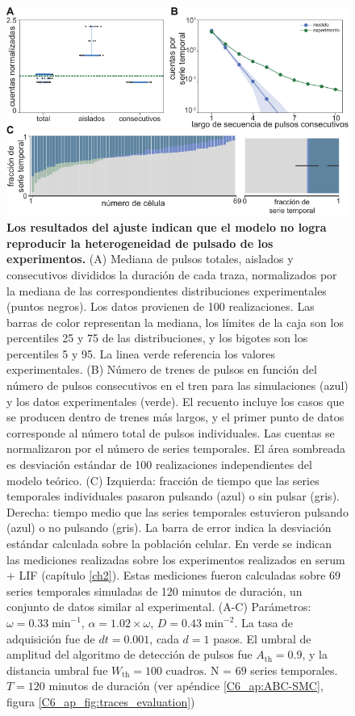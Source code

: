 \documentclass[./main.tex]{subfiles}
\begin{document}
\begin{figure}
    \centering
    \includegraphics[width=1\columnwidth]{figures/chapter6/C6_param_evaluation.pdf} 
    \caption{\textbf{Los resultados del ajuste indican que el modelo no logra reproducir la heterogeneidad de pulsado de los experimentos.} (A) Mediana de pulsos totales, aislados y consecutivos divididos la duración de cada traza, normalizados por la mediana de las correspondientes distribuciones experimentales (puntos negros). Los datos provienen de 100 realizaciones. Las barras de color representan la mediana, los límites de la caja son los percentiles 25 y 75 de las distribuciones, y los bigotes son los percentiles 5 y 95. La linea verde referencia los valores experimentales. (B) Número de trenes de pulsos en función del número de pulsos consecutivos en el tren para las simulaciones (azul) y los datos experimentales (verde). El recuento incluye los casos que se producen dentro de trenes más largos, y el primer punto de datos corresponde al número total de pulsos individuales. Las cuentas se normalizaron por el número de series temporales. El área sombreada es desviación estándar de 100 realizaciones independientes del modelo teórico. (C) Izquierda: fracción de tiempo que las series temporales individuales pasaron pulsando (azul) o sin pulsar (gris). Derecha: tiempo medio que las series temporales estuvieron pulsando (azul) o no pulsando (gris). La barra de error indica la desviación estándar calculada sobre la población celular. En verde se indican las mediciones realizadas sobre los experimentos realizados en serum + LIF (capítulo \ref{ch2}). Estas mediciones fueron calculadas sobre 69 series temporales simuladas de 120 minutos de duración, un conjunto de datos similar al experimental. (A-C) Parámetros:  $\omega = 0.33 \;\text{min}^{-1}$, $\alpha = 1.02 \times \omega$, $ D = 0.43 \; \text{min}^{-2}$. La tasa de adquisición fue de $dt = 0.001$, cada $d = 1$ pasos. El umbral de amplitud del algoritmo de detección de pulsos fue $A_{\text{th}} = 0.9$, y la distancia umbral fue $W_{\text{th}} = 100\text{ cuadros}$. N = $69$ series temporales. $T = 120$ minutos de duración (ver apéndice \ref{C6_ap:ABC-SMC}, figura \ref{C6_ap_fig:traces_evaluation})}
    \label{C6_fig:param_evaluation}
\end{figure} 
\end{document}
